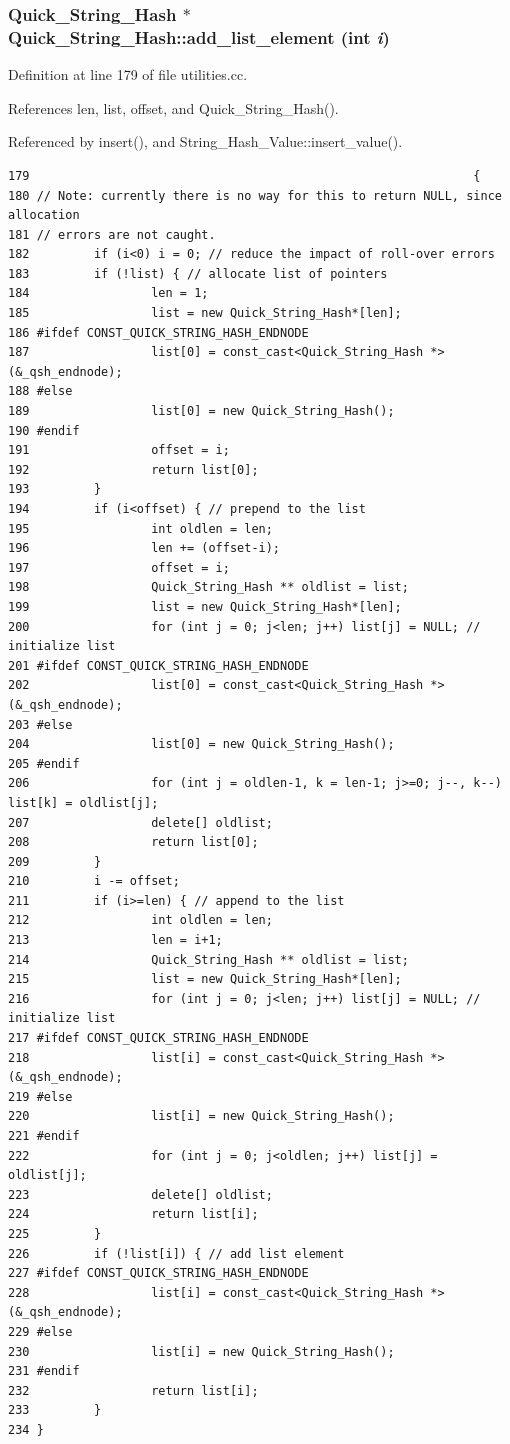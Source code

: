 \subsubsection{\setlength{\rightskip}{0pt plus 5cm}Quick\_\-String\_\-Hash $\ast$ Quick\_\-String\_\-Hash::add\_\-list\_\-element (int {\em i})\hspace{0.3cm}{\tt  [protected]}}\label{classQuick__String__Hash_b0}




Definition at line 179 of file utilities.cc.

References len, list, offset, and Quick\_\-String\_\-Hash().

Referenced by insert(), and String\_\-Hash\_\-Value::insert\_\-value().



\footnotesize\begin{verbatim}179                                                              {
180 // Note: currently there is no way for this to return NULL, since allocation
181 // errors are not caught.
182         if (i<0) i = 0; // reduce the impact of roll-over errors
183         if (!list) { // allocate list of pointers
184                 len = 1;
185                 list = new Quick_String_Hash*[len];
186 #ifdef CONST_QUICK_STRING_HASH_ENDNODE
187                 list[0] = const_cast<Quick_String_Hash *>(&_qsh_endnode);
188 #else
189                 list[0] = new Quick_String_Hash();
190 #endif
191                 offset = i;
192                 return list[0];
193         }
194         if (i<offset) { // prepend to the list
195                 int oldlen = len;
196                 len += (offset-i);
197                 offset = i;
198                 Quick_String_Hash ** oldlist = list;
199                 list = new Quick_String_Hash*[len];
200                 for (int j = 0; j<len; j++) list[j] = NULL; // initialize list
201 #ifdef CONST_QUICK_STRING_HASH_ENDNODE
202                 list[0] = const_cast<Quick_String_Hash *>(&_qsh_endnode);
203 #else
204                 list[0] = new Quick_String_Hash();
205 #endif
206                 for (int j = oldlen-1, k = len-1; j>=0; j--, k--) list[k] = oldlist[j];
207                 delete[] oldlist;
208                 return list[0];
209         }
210         i -= offset;
211         if (i>=len) { // append to the list
212                 int oldlen = len;
213                 len = i+1;
214                 Quick_String_Hash ** oldlist = list;
215                 list = new Quick_String_Hash*[len];
216                 for (int j = 0; j<len; j++) list[j] = NULL; // initialize list
217 #ifdef CONST_QUICK_STRING_HASH_ENDNODE
218                 list[i] = const_cast<Quick_String_Hash *>(&_qsh_endnode);
219 #else
220                 list[i] = new Quick_String_Hash();
221 #endif
222                 for (int j = 0; j<oldlen; j++) list[j] = oldlist[j];
223                 delete[] oldlist;
224                 return list[i];
225         }
226         if (!list[i]) { // add list element
227 #ifdef CONST_QUICK_STRING_HASH_ENDNODE
228                 list[i] = const_cast<Quick_String_Hash *>(&_qsh_endnode);
229 #else
230                 list[i] = new Quick_String_Hash();
231 #endif
232                 return list[i];
233         }
234 }
\end{verbatim}\normalsize 
